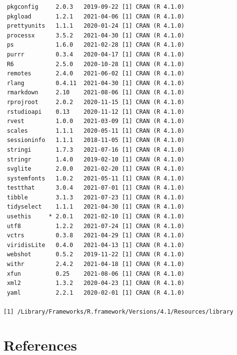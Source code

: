 \documentclass [11pt, proquest] {uwthesis}[2015/03/03]
\begin{document}
\begin{verbatim}
 pkgconfig     2.0.3   2019-09-22 [1] CRAN (R 4.1.0)                       
 pkgload       1.2.1   2021-04-06 [1] CRAN (R 4.1.0)                       
 prettyunits   1.1.1   2020-01-24 [1] CRAN (R 4.1.0)                       
 processx      3.5.2   2021-04-30 [1] CRAN (R 4.1.0)                       
 ps            1.6.0   2021-02-28 [1] CRAN (R 4.1.0)                       
 purrr         0.3.4   2020-04-17 [1] CRAN (R 4.1.0)                       
 R6            2.5.0   2020-10-28 [1] CRAN (R 4.1.0)                       
 remotes       2.4.0   2021-06-02 [1] CRAN (R 4.1.0)                       
 rlang         0.4.11  2021-04-30 [1] CRAN (R 4.1.0)                       
 rmarkdown     2.10    2021-08-06 [1] CRAN (R 4.1.0)                       
 rprojroot     2.0.2   2020-11-15 [1] CRAN (R 4.1.0)                       
 rstudioapi    0.13    2020-11-12 [1] CRAN (R 4.1.0)                       
 rvest         1.0.0   2021-03-09 [1] CRAN (R 4.1.0)                       
 scales        1.1.1   2020-05-11 [1] CRAN (R 4.1.0)                       
 sessioninfo   1.1.1   2018-11-05 [1] CRAN (R 4.1.0)                       
 stringi       1.7.3   2021-07-16 [1] CRAN (R 4.1.0)                       
 stringr       1.4.0   2019-02-10 [1] CRAN (R 4.1.0)                       
 svglite       2.0.0   2021-02-20 [1] CRAN (R 4.1.0)                       
 systemfonts   1.0.2   2021-05-11 [1] CRAN (R 4.1.0)                       
 testthat      3.0.4   2021-07-01 [1] CRAN (R 4.1.0)                       
 tibble        3.1.3   2021-07-23 [1] CRAN (R 4.1.0)                       
 tidyselect    1.1.1   2021-04-30 [1] CRAN (R 4.1.0)                       
 usethis     * 2.0.1   2021-02-10 [1] CRAN (R 4.1.0)                       
 utf8          1.2.2   2021-07-24 [1] CRAN (R 4.1.0)                       
 vctrs         0.3.8   2021-04-29 [1] CRAN (R 4.1.0)                       
 viridisLite   0.4.0   2021-04-13 [1] CRAN (R 4.1.0)                       
 webshot       0.5.2   2019-11-22 [1] CRAN (R 4.1.0)                       
 withr         2.4.2   2021-04-18 [1] CRAN (R 4.1.0)                       
 xfun          0.25    2021-08-06 [1] CRAN (R 4.1.0)                       
 xml2          1.3.2   2020-04-23 [1] CRAN (R 4.1.0)                       
 yaml          2.2.1   2020-02-01 [1] CRAN (R 4.1.0)                       

[1] /Library/Frameworks/R.framework/Versions/4.1/Resources/library
\end{verbatim}
\backmatter

\hypertarget{references}{%
\chapter*{References}\label{references}}
\end{document}
